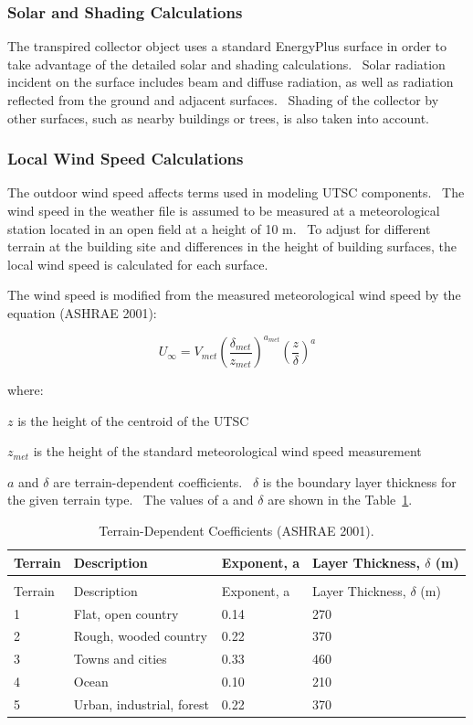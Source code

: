 \subsubsection{Solar and Shading Calculations}\label{solar-and-shading-calculations-2}

The transpired collector object uses a standard EnergyPlus surface in order to take advantage of the detailed solar and shading calculations.~ Solar radiation incident on the surface includes beam and diffuse radiation, as well as radiation reflected from the ground and adjacent surfaces.~ Shading of the collector by other surfaces, such as nearby buildings or trees, is also taken into account.

\subsubsection{Local Wind Speed Calculations}\label{local-wind-speed-calculations-000}

The outdoor wind speed affects terms used in modeling UTSC components.~ The wind speed in the weather file is assumed to be measured at a meteorological station located in an open field at a height of 10 m.~ To adjust for different terrain at the building site and differences in the height of building surfaces, the local wind speed is calculated for each surface.

The wind speed is modified from the measured meteorological wind speed by the equation (ASHRAE 2001):

\begin{equation}
{U_\infty } = {V_{met}}{\left( {\frac{{{\delta_{met}}}}{{{z_{met}}}}} \right)^{{a_{met}}}}{\left( {\frac{z}{\delta }} \right)^a}
\end{equation}

where:

\(z\) is the height of the centroid of the UTSC

\(z_{met}\) is the height of the standard meteorological wind speed measurement

\(a\) and \({\delta}\) are terrain-dependent coefficients.~ \({\delta}\) is the boundary layer thickness for the given terrain type.~ The values of a and \({\delta}\) are shown in the Table~\ref{table:terrain-dependent-coefficients-ashrae-2001.-001}.

\begin{longtable}[c]{@{}llll@{}}
\caption{Terrain-Dependent Coefficients (ASHRAE 2001). \label{table:terrain-dependent-coefficients-ashrae-2001.-001}} \tabularnewline
\toprule
Terrain & Description & Exponent, a & Layer Thickness, $\delta$ (m) \tabularnewline
\midrule
\endfirsthead

\caption[]{Terrain-Dependent Coefficients (ASHRAE 2001).} \tabularnewline
\toprule
Terrain & Description & Exponent, a & Layer Thickness, $\delta$ (m) \tabularnewline
\midrule
\endhead

1 & Flat, open country & 0.14 & 270 \tabularnewline
2 & Rough, wooded country & 0.22 & 370 \tabularnewline
3 & Towns and cities & 0.33 & 460 \tabularnewline
4 & Ocean & 0.10 & 210 \tabularnewline
5 & Urban, industrial, forest & 0.22 & 370 \tabularnewline
\bottomrule
\end{longtable}

